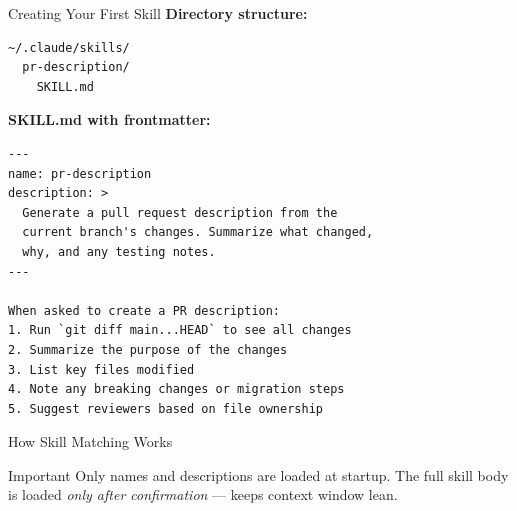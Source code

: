 \documentclass[aspectratio=169]{beamer}
\begin{document}
\begin{frame}[fragile]{Creating Your First Skill}
\textbf{Directory structure:}
\begin{lstlisting}
~/.claude/skills/
  pr-description/
    SKILL.md
\end{lstlisting}

\textbf{SKILL.md with frontmatter:}
\begin{lstlisting}[]
---
name: pr-description
description: >
  Generate a pull request description from the
  current branch's changes. Summarize what changed,
  why, and any testing notes.
---

When asked to create a PR description:
1. Run `git diff main...HEAD` to see all changes
2. Summarize the purpose of the changes
3. List key files modified
4. Note any breaking changes or migration steps
5. Suggest reviewers based on file ownership
\end{lstlisting}
\end{frame}

\begin{frame}{How Skill Matching Works}
\begin{center}
\end{center}

\bigskip
\begin{alertblock}{Important}
Only names and descriptions are loaded at startup. The full skill body is loaded \emph{only after confirmation} --- keeps context window lean.
\end{alertblock}
\end{frame}
\end{document}
